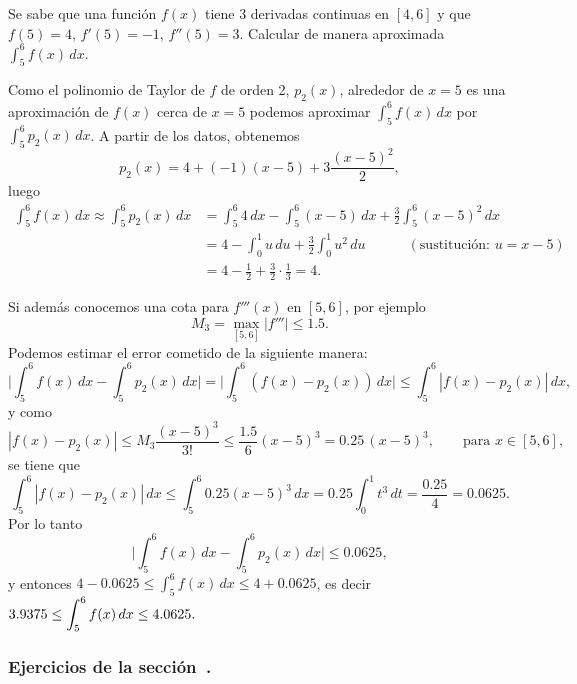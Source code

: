 \begin{example}
 Se sabe que una función $f(x)$ tiene 3 derivadas continuas en $[4,6]$ y que $f(5) = 4$, $f'(5) = -1$, $f''(5) = 3$. Calcular de manera aproximada $\int_5^6 f(x) \, dx$.

Como el polinomio de Taylor de $f$ de orden 2, $p_2(x)$, alrededor de $x=5$ es una aproximación de $f(x)$ cerca de $x=5$ podemos aproximar $\int_5^6 f(x)\, dx$ por $\int_5^6 p_2(x)\, dx$.
A partir de los datos, obtenemos
\[
 p_2(x) = 4 + (-1) (x-5) + 3 \frac{(x-5)^2}{2},
\]
luego
\[
\begin{aligned}
 \int_5^6 f(x) \, dx \approx \int_5^6 p_2(x) \, dx &= \int_5^6 4 \, dx - \int_5^6 (x-5) \, dx + \frac32 \int_5^6 (x-5)^2\, dx \\
&= 4 - \int_0^1 u \, du + \frac32 \int_0^1 u^2 \, du \quad\qquad(\text{sustitución: }u = x-5) \\
&= 4 - \frac12 + \frac32 \cdot \frac13 = 4.
\end{aligned}
\]

Si además conocemos una cota para $f'''(x)$ en $[5,6]$, por ejemplo
\[
 M_3 = \max_{[5,6]} |f'''| \le 1.5.
\]
Podemos estimar el error cometido de la siguiente manera:
\[
 \Big| \int_5^6 f(x)\, dx - \int_5^6 p_2(x) \, dx \Big|
= \Big| \int_5^6 (f(x) - p_2(x)) \, dx \Big|
\le \int_5^6 |f(x) - p_2(x)| \, dx,
\]
y como 
\[
 |f(x) - p_2(x)| \le M_3 \frac{(x-5)^3}{3!} \le \frac{1.5}{6} (x-5)^3 = 0.25 \, (x-5)^3, \qquad\text{para } x \in [5,6],
\]
se tiene que
\[
 \int_5^6 |f(x) - p_2(x)|\, dx \le \int_5^6 0.25 (x-5)^3 \, dx = 0.25 \int_0^1 t^3 \, dt = \frac{0.25}{4} = 0.0625.
\]
Por lo tanto
\[
 \Big| \int_5^6 f(x)\, dx - \int_5^6 p_2(x) \, dx \Big| \le 0.0625,
\]
y entonces $ 4 - 0.0625 \le \int_5^6 f(x) \, dx \le 4 + 0.0625 $, es decir
$\displaystyle
 3.9375 \le \int_5^6 f(x) \, dx \le 4.0625.
$
 






\end{example}



\subsubsection*{Ejercicios de la sección~.}

\begin{enumerate}

\end{enumerate}

